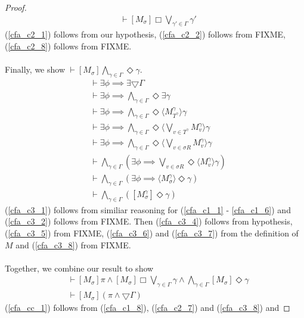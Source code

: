 \documentclass[12pt, a4paper, titlepage]{scrartcl}
\numberwithin{equation}{section}
\newcommand{\cover}{\bigtriangledown}
\newcommand{\sqex}[1]{[{#1}]}
\newcommand{\anex}[1]{\langle {#1} \rangle}
\begin{document}
\begin{proof}
\begin{align}
	& \vdash \sqex{M_\sigma} \Box \bigvee_{\gamma' \in \Gamma} \gamma'\label{cfa_c2_8} 
\end{align}
(\ref{cfa_c2_1}) follows from our hypothesis, (\ref{cfa_c2_2}) follows from FIXME, (\ref{cfa_c2_8})
	follows from FIXME.\\
\\
Finally, we show $\vdash \sqex{M_\sigma}\bigwedge_{\gamma \in \Gamma} \Diamond \gamma$.
\begin{align}
	& \vdash \exists \phi \implies \exists \cover \Gamma \label{cfa_c3_1}\\
	& \vdash \exists \phi \implies \bigwedge_{\gamma \in \Gamma} \Diamond \exists \gamma\label{cfa_c3_2}\\
	& \vdash \exists \phi \implies \bigwedge_{\gamma \in \Gamma} \Diamond \anex{
	M^\gamma_{T^{\gamma}} } \gamma\label{cfa_c3_3}\\
	& \vdash \exists \phi \implies \bigwedge_{\gamma \in \Gamma} \Diamond \anex{
	\bigvee_{v \in T^\gamma} M^\gamma_{v} } \gamma\label{cfa_c3_4}\\
	& \vdash \exists \phi \implies \bigwedge_{\gamma \in \Gamma} \Diamond \anex{
	\bigvee_{v \in \sigma R} M^\gamma_{v} } \gamma\label{cfa_c3_5}\\
	& \vdash \bigwedge_{\gamma \in \Gamma} (\exists \phi \implies \bigvee_{v \in \sigma R}
	\Diamond \anex{ M^\gamma_{v} } \gamma)\label{cfa_c3_6}\\
	& \vdash \bigwedge_{\gamma \in \Gamma} (\exists \phi \implies \anex{ M^\gamma_{\sigma}
	} \Diamond \gamma)\label{cfa_c3_7}\\
	& \vdash \bigwedge_{\gamma \in \Gamma} ([M^\gamma_{\sigma}] \Diamond \gamma)\label{cfa_c3_8}
\end{align}
(\ref{cfa_c3_1}) follows from similiar reasoning for (\ref{cfa_c1_1} - \ref{cfa_c1_6}) and
(\ref{cfa_c3_2}) follows from FIXME.
Then (\ref{cfa_c3_4}) follows from hypothesis, (\ref{cfa_c3_5}) from FIXME, (\ref{cfa_c3_6}) and
(\ref{cfa_c3_7}) from the definition of $M$ and (\ref{cfa_c3_8}) from FIXME.\\
\\
Together, we combine our result to show
\begin{align}
	& \vdash \sqex{M_\sigma} \pi \land \sqex{M_\sigma} \Box \bigvee_{\gamma \in \Gamma} \gamma \land
	\bigwedge_{\gamma \in \Gamma} \sqex{M_\sigma} \Diamond \gamma \label{cfa_cc_1} \\
	& \vdash \sqex{M_\sigma}(\pi \land \cover \Gamma) \label{cfa_cc_2}
\end{align}
(\ref{cfa_cc_1}) follows from (\ref{cfa_c1_8}), (\ref{cfa_c2_7}) and (\ref{cfa_c3_8}) and

\end{proof}
\end{document}
